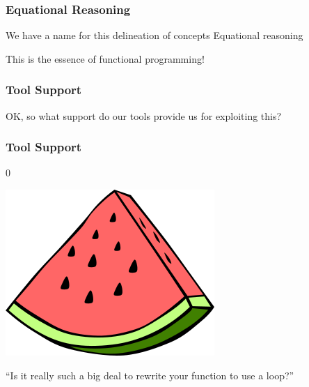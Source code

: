 \begin{frame}
\frametitle{Equational Reasoning}
\begin{block}{We have a name for this delineation of concepts}
Equational reasoning
\end{block}
\vspace{3em}
\begin{center}
This is the essence of functional programming!
\end{center}
\end{frame}


\begin{frame}
\frametitle{Tool Support}
OK, so what support do our tools provide us for exploiting this?
\end{frame}


\begin{frame}
\frametitle{Tool Support}
\begin{center}
\huge{0}\normalsize
\end{center}
\vspace{2em}
\begin{center}
\includegraphics[width=0.3\paperwidth]{image/watermelon.png}
\end{center}
\vspace{1em}
\begin{center}
\tiny{``Is it really such a big deal to rewrite your function to use a loop?''}\normalsize
\end{center}
\end{frame}


